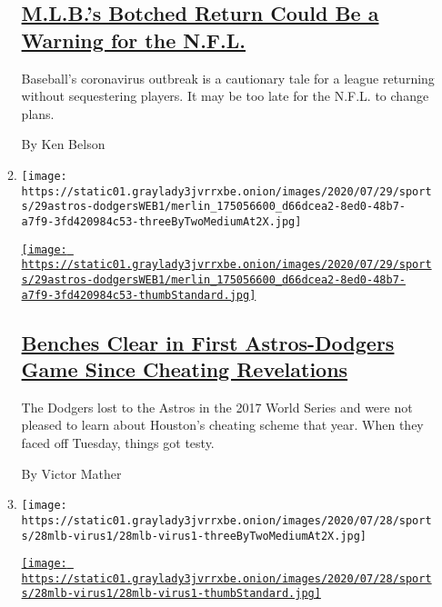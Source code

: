 \begin{enumerate}
\begin{enumerate}
{    \subsection{\texorpdfstring{\href{/2020/07/29/sports/football/nfl-mlb-opting-out.html}{M.L.B.'s
    Botched Return Could Be a Warning for the
    N.F.L.}}{M.L.B.'s Botched Return Could Be a Warning for the N.F.L.}}\label{mlbs-botched-return-could-be-a-warning-for-the-nfl}}

    Baseball's coronavirus outbreak is a cautionary tale for a league
    returning without sequestering players. It may be too late for the
    N.F.L. to change plans.

    By Ken Belson
  \item
    \texttt{[image: https://static01.graylady3jvrrxbe.onion/images/2020/07/29/sports/29astros-dodgersWEB1/merlin\_175056600\_d66dcea2-8ed0-48b7-a7f9-3fd420984c53-threeByTwoMediumAt2X.jpg]}

    \href{/2020/07/29/sports/baseball/dodgers-astros-fight.html}{\texttt{[image: https://static01.graylady3jvrrxbe.onion/images/2020/07/29/sports/29astros-dodgersWEB1/merlin\_175056600\_d66dcea2-8ed0-48b7-a7f9-3fd420984c53-thumbStandard.jpg]}}

    \hypertarget{benches-clear-in-first-astros-dodgers-game-since-cheating-revelations}{%
    \subsection{\texorpdfstring{\href{/2020/07/29/sports/baseball/dodgers-astros-fight.html}{Benches
    Clear in First Astros-Dodgers Game Since Cheating
    Revelations}}{Benches Clear in First Astros-Dodgers Game Since Cheating Revelations}}\label{benches-clear-in-first-astros-dodgers-game-since-cheating-revelations}}

    The Dodgers lost to the Astros in the 2017 World Series and were not
    pleased to learn about Houston's cheating scheme that year. When
    they faced off Tuesday, things got testy.

    By Victor Mather
  \item
    \texttt{[image: https://static01.graylady3jvrrxbe.onion/images/2020/07/28/sports/28mlb-virus1/28mlb-virus1-threeByTwoMediumAt2X.jpg]}

    \href{/2020/07/28/sports/baseball/marlins-outbreak-mlb-coronavirus.html}{\texttt{[image: https://static01.graylady3jvrrxbe.onion/images/2020/07/28/sports/28mlb-virus1/28mlb-virus1-thumbStandard.jpg]}}


\end{enumerate}
\end{enumerate}
